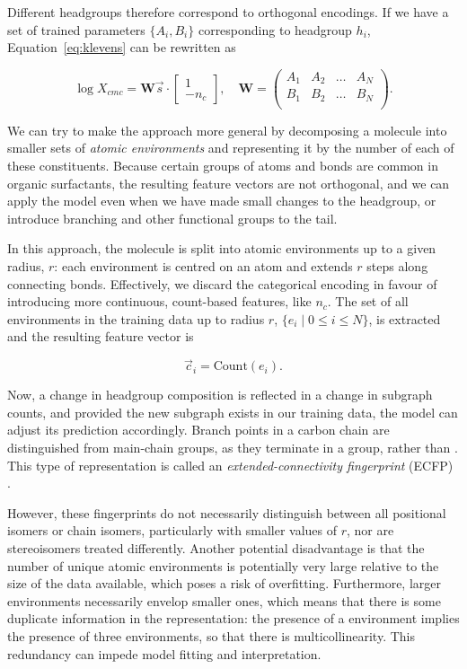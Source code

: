 Different headgroups therefore correspond to orthogonal encodings. If we have a
set of trained parameters $\{A_i, B_i\}$ corresponding to headgroup $h_i$,
Equation~\ref{eq:klevens} can be rewritten as

\begin{equation}
    \log X_{cmc} = \mathbf{W}\vec{s} \cdot \begin{bmatrix}
        1 \\ -n_c
    \end{bmatrix},\quad \mathbf{W} = \begin{pmatrix}
        A_1 & A_2 & \dots  & A_N\\
        B_1 & B_2 & \dots & B_N\\
    \end{pmatrix}.
\end{equation}

We can try to make the approach more general by decomposing a molecule into
smaller sets of \emph{atomic environments} and representing it by the number of
each of these constituents. Because certain groups of atoms and bonds are common
in organic surfactants, the resulting feature vectors are not orthogonal, and we
can apply the model even when we have made small changes to the headgroup, or
introduce branching and other functional groups to the tail.

In this approach, the molecule is split into atomic environments up to a given
radius, $r$: each environment is centred on an atom and extends $r$ steps along
connecting bonds. Effectively, we discard the categorical encoding in favour of
introducing more continuous, count-based features, like $n_c$. The set of all
environments in the training data up to radius $r$, $\{e_i \mid 0 \leq i \leq
N\}$, is extracted and the resulting feature vector is

\begin{equation}
    \label{eq:ecfp}
    \vec{c}_i = \text{Count}(e_i).
\end{equation}

Now, a change in headgroup composition is reflected in a change in subgraph
counts, and provided the new subgraph exists in our training data, the model can
adjust its prediction accordingly. Branch points in a carbon chain are
distinguished from main-chain groups, as they terminate in a  group,
rather than . This type of representation is called an
\emph{extended-connectivity fingerprint} (ECFP)
\cite{rogersExtendedConnectivityFingerprints2010}.

However, these fingerprints do not necessarily distinguish between all
positional isomers or chain isomers, particularly with smaller values of $r$,
nor are stereoisomers treated differently. Another potential disadvantage is
that the number of unique atomic environments is potentially very large relative
to the size of the data available, which poses a risk of overfitting.
Furthermore, larger environments necessarily envelop smaller ones, which means
that there is some duplicate information in the representation: the presence of
a  environment implies the presence of three  environments,
so that there is multicollinearity. This redundancy can impede model fitting and
interpretation.

